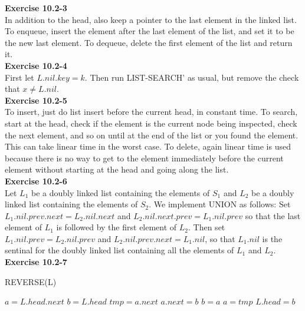 \documentclass{article}
\begin{document}
\noindent\textbf{ Exercise 10.2-3} \\

In addition to the head, also keep a pointer to the last element in the linked list. To enqueue, insert the element after the last element of the list, and set it to be the new last element. To dequeue, delete the first element of the list and return it.\\

\noindent\textbf{Exercise 10.2-4}\\

First let $L.nil.key = k$.  Then run LIST-SEARCH' as usual, but remove the check that $x \neq L.nil$. \\

\noindent\textbf{ Exercise 10.2-5} \\

To insert, just do list insert before the current head, in constant time. To search, start at the head, check if the element is the current node being inspected, check the next element, and so on until at the end of the list or you found the element. This can take linear time in the worst case. To delete, again linear time is used because there is no way to get to the element immediately before the current element without starting at the head and going along the list.\\

\noindent\textbf{Exercise 10.2-6}\\

Let $L_1$ be a doubly linked list containing the elements of $S_1$ and $L_2$ be a doubly linked list containing the elements of $S_2$.  We implement UNION as follows: Set $L_1.nil.prev.next = L_2.nil.next$ and $L_2.nil.next.prev = L_1.nil.prev$ so that the last element of $L_1$ is followed by the first element of $L_2$.  Then set $L_1.nil.prev = L_2.nil.prev$ and $L_2.nil.prev.next = L_1.nil$, so that $L_1.nil$ is the sentinal for the doubly linked list containing all the elements of $L_1$ and $L_2$. \\

\noindent\textbf{ Exercise 10.2-7} \\

\begin{algorithm}
\caption{REVERSE(L)}
\begin{algorithmic}
\State $a = L.head.next$
\State $b = L.head$
\State $tmp = a.next$
\State $a.next = b$
\State $b = a$
\State $a= tmp$
\EndWhile
\State $L.head  = b$
\end{algorithmic}
\end{algorithm}
\end{document}
